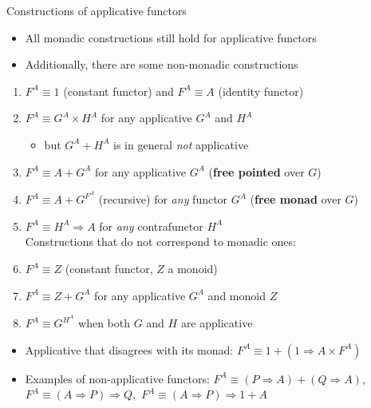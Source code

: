 \documentclass[english]{beamer}
\begin{document}
\begin{frame}{Constructions of applicative functors}
\begin{itemize}
\item \vspace{-0.10cm}All monadic constructions still hold for applicative
functors
\item Additionally, there are some non-monadic constructions
\end{itemize}
\begin{enumerate}
\item $F^{A}\equiv1$ (constant functor) and $F^{A}\equiv A$ (identity
functor)
\item $F^{A}\equiv G^{A}\times H^{A}$ for any applicative $G^{A}$ and
$H^{A}$
\begin{itemize}
\item but $G^{A}+H^{A}$ is in general \emph{not} applicative
\end{itemize}
\item $F^{A}\equiv A+G^{A}$ for any applicative $G^{A}$ (\textbf{free
pointed} over $G$)
\item $F^{A}\equiv A+G^{F^{A}}$ (recursive) for \emph{any} functor $G^{A}$
(\textbf{free monad} over $G$)
\item $F^{A}\equiv H^{A}\Rightarrow A$ for \emph{any} contrafunctor $H^{A}$\\
Constructions that do not correspond to monadic ones:
\item $F^{A}\equiv Z$ (constant functor, $Z$ a monoid)
\item $F^{A}\equiv Z+G^{A}$ for any applicative $G^{A}$ and monoid $Z$
\item $F^{A}\equiv G^{H^{A}}$ when both $G$ and $H$ are applicative
\end{enumerate}
\begin{itemize}
\item Applicative that disagrees with its monad: $F^{A}\equiv1+\left(1\Rightarrow A\times F^{A}\right)$ 
\item Examples of non-applicative functors: $F^{A}\equiv\left(P\Rightarrow A\right)+\left(Q\Rightarrow A\right)$,
$F^{A}\equiv\left(A\Rightarrow P\right)\Rightarrow Q$,\  $F^{A}\equiv\left(A\Rightarrow P\right)\Rightarrow1+A$
\end{itemize}
\end{frame}
\end{document}
